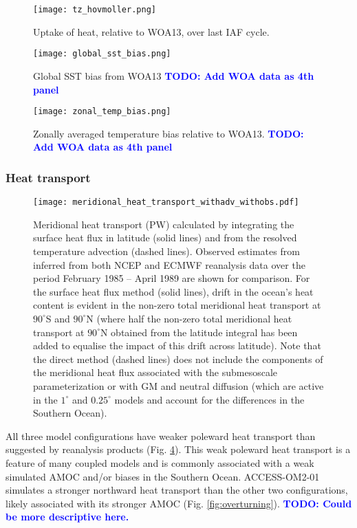 \documentclass[gmd, manuscript]{copernicus}
\newcommand{\TODO}[1]{\textcolor{blue}{\textsf{\textbf{TODO: #1}}}}
\begin{document}
\begin{figure}[t]
\texttt{[image: tz\_hovmoller.png]}
\caption{Uptake of heat, relative to WOA13, over last IAF cycle. \label{fig:hovmoller}}
\end{figure}

\begin{figure}[t]
\texttt{[image: global\_sst\_bias.png]}
\caption{Global SST bias from WOA13 \TODO{Add WOA data as 4th panel}\label{fig:sstbias}}
\end{figure}

\begin{figure}[t]
 \texttt{[image: zonal\_temp\_bias.png]}
 \caption{Zonally averaged temperature bias relative to WOA13. \TODO{Add WOA data as 4th panel} \label{fig:zonaltemp}}
\end{figure}

\clearpage

\subsubsection{Heat transport} 

\begin{figure}[t]
\texttt{[image: meridional\_heat\_transport\_withadv\_withobs.pdf]}
\caption{Meridional heat transport (PW) calculated by integrating the surface heat flux in latitude (solid lines) and from the resolved temperature advection (dashed lines).
  Observed estimates from \citet{Trenberth2001} inferred from both NCEP and ECMWF reanalysis data over the period February 1985 -- April 1989 are shown for comparison.
  For the surface heat flux method (solid lines), drift in the ocean's heat content is evident in the non-zero total meridional heat transport at $90^\circ$S and $90^\circ$N (where half the non-zero total meridional heat transport at $90^\circ$N obtained from the latitude integral has been added to equalise the impact of this drift across latitude).
  Note that the direct method (dashed lines) does not include the components of the meridional heat flux associated with the submesoscale parameterization or with GM and neutral diffusion (which are active in the $1^\circ$ and $0.25^\circ$ models and account for the differences in the Southern Ocean).
  \label{fig:MHT}}
\end{figure}

All three model configurations have weaker poleward heat transport than suggested by reanalysis products (Fig. \ref{fig:MHT}).
This weak poleward heat transport is a feature of many coupled models \citet[e.g.][]{Griffies2015} and is commonly associated with a weak simulated AMOC \citep{Wang2014} and/or biases in the Southern Ocean.
ACCESS-OM2-01 simulates a stronger northward heat transport than the other two configurations, likely associated with its stronger AMOC (Fig. \ref{fig:overturning}).
\TODO{Could be more descriptive here.}
\end{document}
